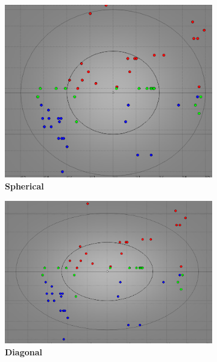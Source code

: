 \begin{figure}[!ht]
\centering
\begin{subfigure}[h]{0.3\textwidth}
\centering
\includegraphics[height=0.08\textheight]{./regression/spheri_kmeans_1_mixture_100train.png}
\caption{\bf Spherical}
\end{subfigure}
\begin{subfigure}[h]{0.3\textwidth}
\centering
\includegraphics[height=0.08\textheight]{./regression/diag_kmeans_1_mixture_100train.png}
\caption{\bf Diagonal}
\end{subfigure}
\begin{subfigure}[h]{0.3\textwidth}
\centering

\end{subfigure}
\end{figure}
